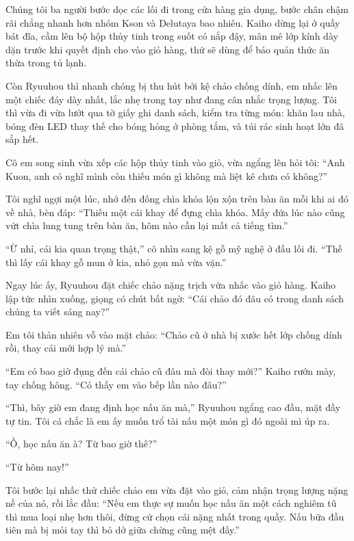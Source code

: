 ﻿\documentclass[../main.tex]{subfiles}
\begin{document}
\ct



Chúng tôi ba người bước dọc các lối đi trong cửa hàng gia dụng, bước chân chậm rãi chẳng nhanh hơn nhóm Kson và Delutaya bao nhiêu. Kaiho dừng lại ở quầy bát đĩa, cầm lên bộ hộp thủy tinh trong suốt có nắp đậy, mân mê lớp kính dày dặn trước khi quyết định cho vào giỏ hàng, thứ sẽ dùng để bảo quản thức ăn thừa trong tủ lạnh.

Còn Ryuuhou thì nhanh chóng bị thu hút bởi kệ chảo chống dính, em nhấc lên một chiếc đáy dày nhất, lắc nhẹ trong tay như đang cân nhắc trọng lượng. Tôi thì vừa đi vừa lướt qua tờ giấy ghi danh sách, kiểm tra từng món: khăn lau nhà, bóng đèn LED thay thế cho bóng hỏng ở phòng tắm, và túi rác sinh hoạt lớn đã sắp hết.

Cô em song sinh vừa xếp các hộp thủy tinh vào giỏ, vừa ngẩng lên hỏi tôi: ``Anh Kuon, anh có nghĩ mình còn thiếu món gì không mà liệt kê chưa có không?''

Tôi nghĩ ngợi một lúc, nhớ đến đống chìa khóa lộn xộn trên bàn ăn mỗi khi ai đó về nhà, bèn đáp: ``Thiếu một cái khay để đựng chìa khóa. Mấy đứa lúc nào cũng vứt chìa lung tung trên bàn ăn, hôm nào cần lại mất cả tiếng tìm.''

``Ừ nhỉ, cái kia quan trọng thật,'' cô nhìn sang kệ gỗ mỹ nghệ ở đầu lối đi. ``Thế thì lấy cái khay gỗ mun ở kia, nhỏ gọn mà vừa vặn.''

Ngay lúc ấy, Ryuuhou đặt chiếc chảo nặng trịch vừa nhấc vào giỏ hàng. Kaiho lập tức nhìn xuống, giọng có chút bất ngờ: ``Cái chảo đó đâu có trong danh sách chúng ta viết sáng nay?''

Em tôi thản nhiên vỗ vào mặt chảo: ``Chảo cũ ở nhà bị xước hết lớp chống dính rồi, thay cái mới hợp lý mà.''

``Em có bao giờ đụng đến cái chảo cũ đâu mà đòi thay mới?'' Kaiho rướn mày, tay chống hông. ``Có thấy em vào bếp lần nào đâu?''

``Thì, bây giờ em đang định học nấu ăn mà,'' Ryuuhou ngẩng cao đầu, mặt đầy tự tin. Tôi cá chắc là em ấy muốn trổ tài nấu một món gì đó ngoài mì úp ra.

``Ồ, học nấu ăn à? Từ bao giờ thế?''

``Từ hôm nay!''

Tôi bước lại nhấc thử chiếc chảo em vừa đặt vào giỏ, cảm nhận trọng lượng nặng nề của nó, rồi lắc đầu: ``Nếu em thực sự muốn học nấu ăn một cách nghiêm tũ thì mua loại nhẹ hơn thôi, đừng cứ chọn cái nặng nhất trong quầy. Nấu bữa đầu tiên mà bị mỏi tay thì bỏ dở giữa chừng cũng mệt đấy.''
\end{document}
